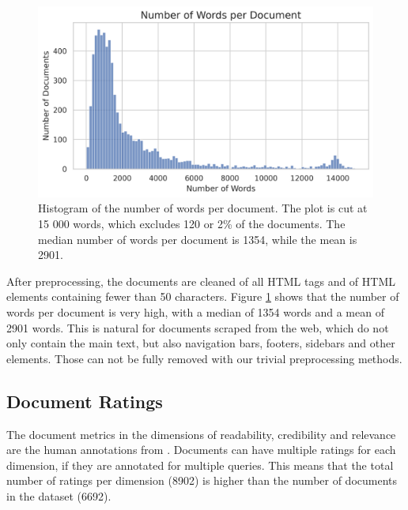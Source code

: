 \begin{figure}[tb]
\centering
\includegraphics[width=\textwidth]{images/num_words_per_passage.png}
\caption{Histogram of the number of words per document. The plot is cut at 15 000 words, which excludes 120 or 2\% of the documents. The median number of words per document is 1354, while the mean is 2901.}
\label{fig:num_words_per_document}
\end{figure}
After preprocessing, the documents are cleaned of all HTML tags and of HTML elements containing fewer than 50 characters.
Figure \ref{fig:num_words_per_document} shows that the number of words per document is very high, with a median of 1354 words and a mean of 2901 words.
This is natural for documents scraped from the web, which do not only contain the main text, but also navigation bars, footers, sidebars and other elements.
Those can not be fully removed with our trivial preprocessing methods.
\subsection{Document Ratings}
The document metrics in the dimensions of readability, credibility and relevance are the human annotations from \cite{goeuriot:2021:Consumer}.
Documents can have multiple ratings for each dimension, if they are annotated for multiple queries.
This means that the total number of ratings per dimension (8902) is higher than the number of documents in the dataset (6692).


